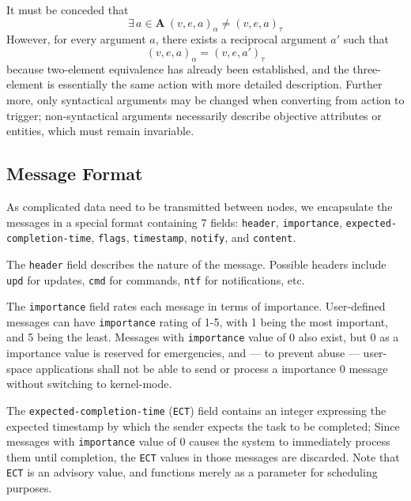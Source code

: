 \documentclass[letterpaper, twocolumn, 10pt, conference]{IEEEtran}
\newcommand{\mono}[1]{\texttt{#1}}
\begin{document}
It must be conceded that \[ \exists\, a \in \mathbf{A} \  (v, e, a)_{\alpha} \ne (v, e, a)_{\tau}\] However, for every argument $a$, there exists a reciprocal argument $a'$ such that \[(v, e, a)_{\alpha} = (v, e, a')_{\tau}\] because two-element equivalence has already been established, and the three-element is essentially the same action with more detailed description. Further more, only syntactical arguments may be changed when converting from action to trigger; non-syntactical arguments necessarily describe objective attributes or entities, which must remain invariable.

\subsection{Message Format} \label{ssec:message_format}

As complicated data need to be transmitted between nodes, we encapsulate the messages in a special format containing 7 fields: \mono{header}, \mono{importance}, \mono{expected-completion-time}, \mono{flags}, \mono{timestamp}, \mono{notify}, and \mono{content}. 

The \mono{header} field describes the nature of the message. Possible headers include \mono{upd} for updates, \mono{cmd} for commands, \mono{ntf} for notifications, etc.
	
The \mono{importance} field rates each message in terms of importance. User-defined messages can have \mono{importance} rating of 1-5, with 1 being the most important, and 5 being the least. Messages with \mono{importance} value of 0 also exist, but 0 as a importance value is reserved for emergencies, and --- to prevent abuse --- user-space applications shall not be able to send or process a importance 0 message without switching to kernel-mode.

The \mono{expected-completion-time} (\mono{ECT}) field contains an integer expressing the expected timestamp by which the sender expects the task to be completed; Since messages with \mono{importance} value of 0 causes the system to immediately process them until completion, the \mono{ECT} values in those messages are discarded. Note that \mono{ECT} is an advisory value, and functions merely as a parameter for scheduling purposes. 
\end{document}
